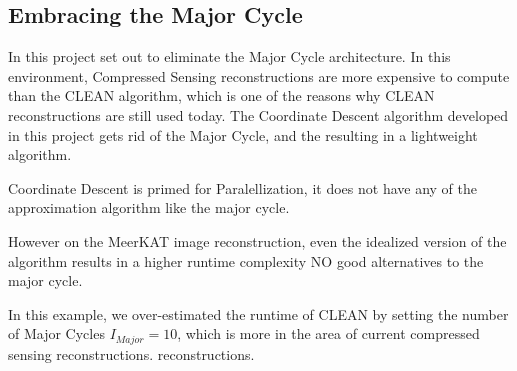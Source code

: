 \subsection{Embracing the Major Cycle}
In this project set out to eliminate the Major Cycle architecture. In this environment, Compressed Sensing reconstructions are more expensive to compute than the CLEAN algorithm, which is one of the reasons why CLEAN reconstructions are still used today. The Coordinate Descent algorithm developed in this project gets rid of the Major Cycle, and the resulting in a lightweight algorithm. 

Coordinate Descent is primed for Paralellization, it does not have any of the approximation algorithm like the major cycle.

However on the MeerKAT image reconstruction, even the idealized version of the algorithm results in a higher runtime complexity
NO good alternatives to the major cycle.


In this example, we over-estimated the runtime of CLEAN by setting the number of Major Cycles $I_{Major} = 10$, which is more in the area of current compressed sensing reconstructions. reconstructions. 

